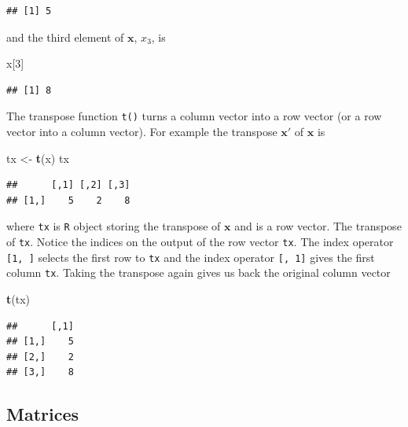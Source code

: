 \documentclass[
]{book}
\newenvironment{Shaded}{\begin{snugshade}}{\end{snugshade}}
\newcommand{\DecValTok}[1]{\textcolor[rgb]{0.00,0.00,0.81}{#1}}
\newcommand{\KeywordTok}[1]{\textcolor[rgb]{0.13,0.29,0.53}{\textbf{#1}}}
\newcommand{\NormalTok}[1]{#1}
\newcommand{\StringTok}[1]{\textcolor[rgb]{0.31,0.60,0.02}{#1}}
\theoremstyle{definition}
\theoremstyle{definition}
\theoremstyle{definition}
\theoremstyle{definition}
\theoremstyle{remark}
\begin{document}
\begin{verbatim}
## [1] 5
\end{verbatim}

and the third element of \(\mathbf{x}\), \(x_3\), is

\begin{Shaded}
\begin{Highlighting}[]
\NormalTok{x[}\DecValTok{3}\NormalTok{]}
\end{Highlighting}
\end{Shaded}

\begin{verbatim}
## [1] 8
\end{verbatim}

The transpose function \texttt{t()} turns a column vector into a row vector (or a row vector into a column vector). For example the transpose \(\mathbf{x}'\) of \(\mathbf{x}\) is

\begin{Shaded}
\begin{Highlighting}[]
\NormalTok{tx <-}\StringTok{ }\KeywordTok{t}\NormalTok{(x)}
\NormalTok{tx}
\end{Highlighting}
\end{Shaded}

\begin{verbatim}
##      [,1] [,2] [,3]
## [1,]    5    2    8
\end{verbatim}

where \texttt{tx} is \texttt{R} object storing the transpose of \(\mathbf{x}\) and is a row vector. The transpose of \texttt{tx}. Notice the indices on the output of the row vector \texttt{tx}. The index operator \texttt{{[}1,\ {]}} selects the first row to \texttt{tx} and the index operator \texttt{{[},\ 1{]}} gives the first column \texttt{tx}. Taking the transpose again gives us back the original column vector

\begin{Shaded}
\begin{Highlighting}[]
\KeywordTok{t}\NormalTok{(tx)}
\end{Highlighting}
\end{Shaded}

\begin{verbatim}
##      [,1]
## [1,]    5
## [2,]    2
## [3,]    8
\end{verbatim}

\hypertarget{matrices}{%
\subsection{Matrices}\label{matrices}}
\end{document}
